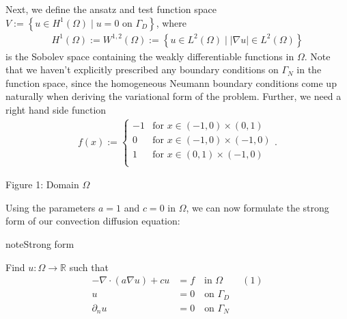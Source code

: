 \documentclass[letterpaper,10pt,english, openany]{sphinxmanual}
\begin{document}
Next, we define the {\color{blue}ansatz} and {\color{blue}test function space} \(V := \left\{ u \in H^1(\Omega)\mid u = 0 \text{ on } \Gamma_D \right\}\),
where
\begin{equation*}
\begin{split}H^1(\Omega) := W^{1,2}(\Omega) := \left\{ u \in L^2(\Omega) \mid |\nabla u| \in L^2( \Omega ) \right\}\end{split}
\end{equation*}
is the Sobolev space containing the weakly differentiable functions
in \(\Omega\). Note that we haven’t explicitly prescribed any boundary conditions on \(\Gamma_N\) in the function space,
since the homogeneous Neumann boundary conditions come up naturally when deriving the variational form of the problem.
Further, we need a right hand side function
\begin{equation*}
\begin{split}f(x) :=
\begin{cases}
   -1 & \text{for } x \in (-1,0) \times (0,1) \\
   0 & \text{for } x \in (-1,0) \times (-1,0) \\
   1 & \text{for } x \in (0,1) \times (-1,0) \\
\end{cases}.\end{split}
\end{equation*}
\begin{figure}[H]
\centering
\def\svgwidth{0.6\columnwidth}
    
\end{figure}

\begin{center}Figure 1: Domain \(\Omega\)
\end{center}
Using the parameters \(a = 1\) and \(c = 0\) in \(\Omega\), we can now
formulate the strong form of our convection diffusion equation:

\begin{sphinxadmonition}{note}{Strong form}

Find \(u: \Omega \rightarrow \mathbb{R}\) such that
\begin{equation*}
\begin{split}-\nabla \cdot \left( a \nabla u\right) + c u &= f \quad \text{in } \Omega \qquad (1)\\
u &= 0 \quad \text{on } \Gamma_D \\
\partial_n u &= 0 \quad \text{on } \Gamma_N\end{split}
\end{equation*}\end{sphinxadmonition}
\end{document}
